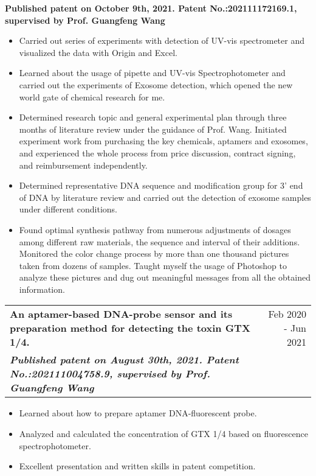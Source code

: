 \documentclass[a4paper,20pt]{article}
\makeatletter
\newcommand{\resumeSubheading}[4]{
  \vspace{-1pt}\item
    \begin{tabular*}{0.97\textwidth}{l@{\extracolsep{\fill}}r}
      \textbf{#1} & #2 \\
      \textit{#3} & \textit{#4} \\
    \end{tabular*}\vspace{-5pt}
}
\makeatother
\begin{document}
\textbf{{Published patent on October 9th, 2021. Patent No.:202111172169.1, supervised by Prof. Guangfeng Wang}{}}
\begin{itemize}
	\item Carried out series of experiments with detection of UV-vis spectrometer and visualized the data with Origin and Excel.
	\item Learned about the usage of pipette and UV-vis Spectrophotometer and carried out the experiments of Exosome detection, which opened the new world gate of chemical research for me.
	\item Determined research topic and general experimental plan through three months of literature review under the guidance of Prof. Wang. Initiated experiment work from purchasing the key chemicals, aptamers and exosomes, and experienced the whole process from price discussion, contract signing, and reimbursement independently.
	\item Determined representative DNA sequence and modification group for 3' end of DNA by literature review and carried out the detection of exosome samples under different conditions.
	\item Found optimal synthesis pathway from numerous adjustments of dosages among different raw materials, the sequence and interval of their additions. Monitored the color change process by more than one thousand pictures taken from dozens of samples. Taught myself the usage of Photoshop to analyze these pictures and dug out meaningful messages from all the obtained information.
\end{itemize}
\vspace{-5pt}
\resumeSubheading
{An aptamer-based DNA-probe sensor and its preparation method for detecting the toxin GTX 1/4. }{Feb 2020 - Jun 2021}
{\textbf{Published patent on August 30th, 2021. Patent No.:202111004758.9, supervised by Prof. Guangfeng Wang}}{}
\begin{itemize}
	\item Learned about how to prepare aptamer DNA-fluorescent probe.
	\item Analyzed and calculated the concentration of GTX 1/4 based on fluorescence spectrophotometer.
	\item Excellent presentation and written skills in patent competition.
\end{itemize}
\end{document}

